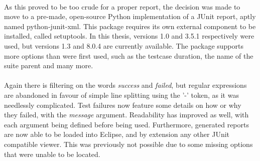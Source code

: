 \documentclass[11pt,british]{article}
\begin{document}
\\
As this proved to be too crude for a proper report, the decision was made to move to a pre-made, open-source Python implementation of a JUnit report, aptly named python-junit-xml.\cite{junitxml} This package requires its own external component to be installed, called setuptools.\cite{setuptools} In this thesis, versions 1.0 and 3.5.1 respectively were used, but versions 1.3 and 8.0.4 are currently available. The package supports more options than were first used, such as the testcase duration, the name of the suite parent and many more.\\
\\
Again there is filtering on the words \emph{success} and \emph{failed}, but regular expressions are abandoned in favour of simple line splitting using the '-' token, as it was needlessly complicated. Test failures now feature some details on how or why they failed, with the \emph{message} argument. Readability has improved as well, with each argument being defined before being used. Furthermore, generated reports are now able to be loaded into Eclipse, and by extension any other JUnit compatible viewer. This was previously not possible due to some missing options that were unable to be located.
\end{document}
